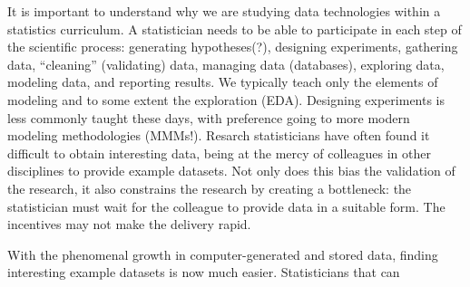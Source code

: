 It is important to understand why we are studying data technologies
within a statistics curriculum.  A statistician needs to be able to
participate in each step of the scientific process: generating
hypotheses(?), designing experiments, gathering data, ``cleaning''
(validating) data, managing data (databases), exploring data, modeling
data, and reporting results.  We typically teach only the elements of
modeling and to some extent the exploration (EDA).  Designing
experiments is less commonly taught these days, with preference going
to more modern modeling methodologies (MMMs!).  Resarch statisticians
have often found it difficult to obtain interesting data, being at the
mercy of colleagues in other disciplines to provide example datasets.
Not only does this bias the validation of the research, it also
constrains the research by creating a bottleneck: the statistician
must wait for the colleague to provide data in a suitable form.  The
incentives may not make the delivery rapid.

With the phenomenal growth in computer-generated and stored data,
finding interesting example datasets is now much easier.
Statisticians that can




